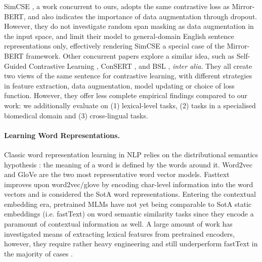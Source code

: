 \documentclass[11pt]{article}
\begin{document}
SimCSE \citep{gao2021simcse}, a work concurrent to ours, adopts the same contrastive loss as Mirror-BERT, and also indicates the importance of data augmentation through dropout. However, they do not investigate random span masking as data augmentation in the input space, and limit their model to general-domain English sentence representations only, effectively rendering SimCSE a special case of the Mirror-BERT framework.
Other concurrent papers explore a similar idea, such as Self-Guided Contrastive Learning \citep{kim-etal-2021-self}, ConSERT \citep{yan-etal-2021-consert}, and BSL \citep{zhang-etal-2021-bootstrapped}, \textit{inter alia}. They all create two views of the same sentence for contrastive learning, with different strategies in feature extraction, data augmentation, model updating or choice of loss function. However, they offer less complete empirical findings compared to our work: we additionally evaluate on (1) lexical-level tasks, (2) tasks in a specialised biomedical domain and (3) cross-lingual tasks.

















\iffalse
\paragraph{Learning Word Representations.}
Classic word representation learning in NLP relies on the distributional semantics hypothesis \citep{harris1954distributional}: the meaning of a word is defined by the words around it. Word2vec \citep{mikolov2013distributed,mikolov2013efficient} and GloVe \citep{pennington2014glove} are the two most representative word vector models. Fasttext improves upon word2vec/glove by encoding char-level information into the word vectors and is considered the SotA word representations. Entering the contextual embedding era, pretrained MLMs have not yet being comparable to SotA static embeddings (i.e. fastText) on word semantic similarity tasks since they encode a paramount of contextual information as well. A large amount of work has investigated means of extracting lexical features from pretrained encoders, however, they require rather heavy engineering and still underperform fastText in the majority of cases \citep{vulic-etal-2020-probing}.
\end{document}
